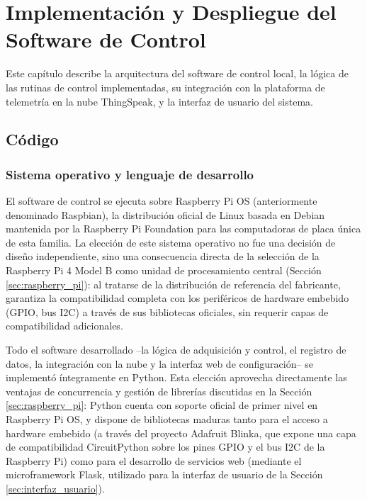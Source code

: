 \chapter{Implementación y Despliegue del Software de Control}
\label{cha:software_control}

Este capítulo describe la arquitectura del software de control local, la lógica de las rutinas de control implementadas, su integración con la plataforma de telemetría en la nube ThingSpeak, y la interfaz de usuario del sistema.

\section{Código}
\label{sec:codigo}

\subsection{Sistema operativo y lenguaje de desarrollo}
\label{subsec:so_lenguaje}

El software de control se ejecuta sobre Raspberry Pi OS (anteriormente denominado Raspbian), la distribución oficial de Linux basada en Debian mantenida por la Raspberry Pi Foundation para las computadoras de placa única de esta familia. La elección de este sistema operativo no fue una decisión de diseño independiente, sino una consecuencia directa de la selección de la Raspberry Pi 4 Model B como unidad de procesamiento central (Sección \ref{sec:raspberry_pi}): al tratarse de la distribución de referencia del fabricante, garantiza la compatibilidad completa con los periféricos de hardware embebido (GPIO, bus I2C) a través de sus bibliotecas oficiales, sin requerir capas de compatibilidad adicionales.

Todo el software desarrollado --la lógica de adquisición y control, el registro de datos, la integración con la nube y la interfaz web de configuración-- se implementó íntegramente en Python. Esta elección aprovecha directamente las ventajas de concurrencia y gestión de librerías discutidas en la Sección \ref{sec:raspberry_pi}: Python cuenta con soporte oficial de primer nivel en Raspberry Pi OS, y dispone de bibliotecas maduras tanto para el acceso a hardware embebido (a través del proyecto Adafruit Blinka, que expone una capa de compatibilidad CircuitPython sobre los pines GPIO y el bus I2C de la Raspberry Pi) como para el desarrollo de servicios web (mediante el microframework Flask, utilizado para la interfaz de usuario de la Sección \ref{sec:interfaz_usuario}).

